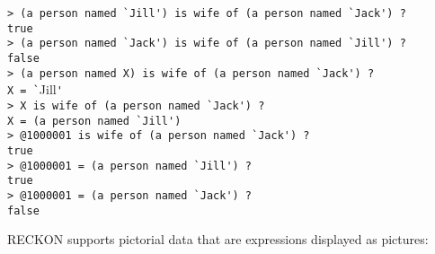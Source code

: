 \documentclass[12pt]{article}
\newenvironment{indpar}[1][0.3in]%
	{\begin{list}{}%
		     {\setlength{\itemsep}{0in}%
		      \setlength{\topsep}{0in}%
		      \setlength{\parsep}{1ex}%
		      \setlength{\labelwidth}{#1}%
		      \setlength{\leftmargin}{#1}%
		      \addtolength{\leftmargin}{\labelsep}}%
	 \item}%
	{\end{list}}
\begin{document}
\begin{indpar}
\verb|> (a person named `Jill') is wife of (a person named `Jack') ?| \\
\verb|true| \\
\verb|> (a person named `Jack') is wife of (a person named `Jill') ?| \\
\verb|false| \\
\verb|> (a person named X) is wife of (a person named `Jack') ?| \\
\verb|X = `|Jill\verb|'| \\
\verb|> X is wife of (a person named `Jack') ?| \\
\verb|X = (a person named `Jill')| \\
\verb|> @1000001 is wife of (a person named `Jack') ?| \\
\verb|true| \\
\verb|> @1000001 = (a person named `Jill') ?| \\
\verb|true| \\
\verb|> @1000001 = (a person named `Jack') ?| \\
\verb|false|
\end{indpar}

RECKON supports pictorial data
that are expressions displayed as pictures:
\end{document}
